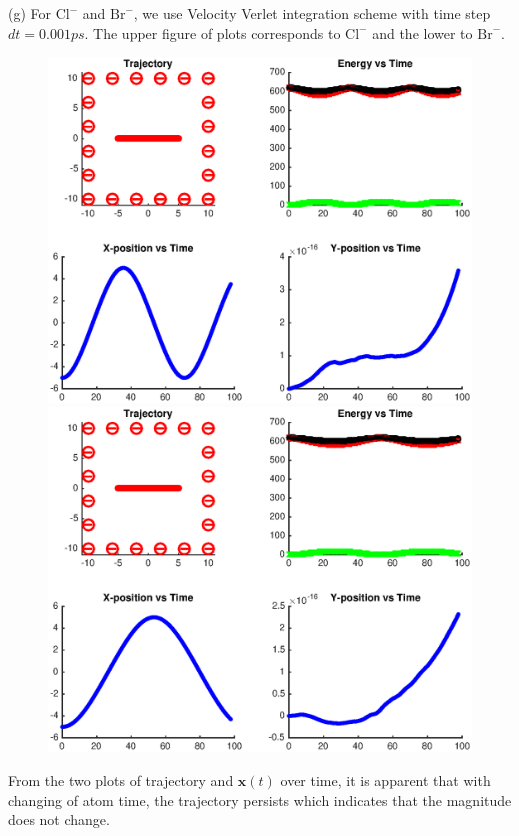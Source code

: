 \documentclass{article}
\begin{document}
\vspace{6mm}
\noindent
(g) For $\text{Cl}^{-}$ and $\text{Br}^{-}$, we use Velocity Verlet integration scheme with time step $dt=0.001ps$. The upper figure of plots corresponds to $\text{Cl}^{-}$ and the lower to $\text{Br}^{-}$.
\begin{figure}
    \centering
    \includegraphics[scale=0.75]{6}
    \includegraphics[scale=0.75]{7}
\end{figure}
\newpage
From the two plots of trajectory and $\mathbf{x}(t)$ over time, it is apparent that with changing of atom time, the trajectory persists which indicates that the magnitude does not change. 
\end{document}
